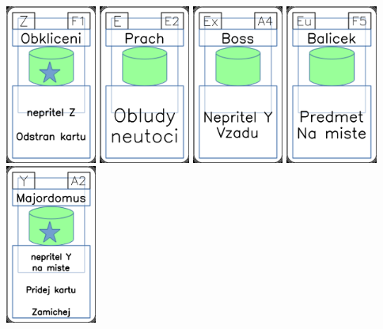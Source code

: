 \documentclass[a4paper]{article}
\begin{document}
	\includegraphics[width=3.0cm]{img-5_55}
	\includegraphics[width=3.0cm]{img-4_51}
	\includegraphics[width=3.0cm]{img-4_3}
	\includegraphics[width=3.0cm]{img-4_29}
	\includegraphics[width=3.0cm]{img-5_31}
\end{document}
